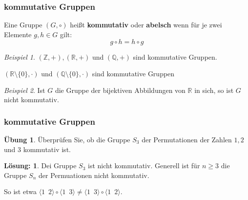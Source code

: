 \documentclass[hyperref={pdfpagelabels=false}]{beamer}
\theoremstyle{plain}%
\theoremstyle{definition}
\newtheorem*{uebung}{Übung}
\newtheorem*{sol}{Lösung:}
\theoremstyle{remark}
\newtheorem*{beispiel}{Beispiel}
\begin{document}
\begin{frame}
\frametitle{kommutative Gruppen}

\begin{definition} Eine Gruppe $(G, \circ)$ heißt \textbf{kommutativ} oder
\textbf{abelsch} wenn für je zwei Elemente $g, h \in G$ gilt:
  	$$ g \circ h = h \circ g $$
\end{definition}

\pause 
\begin{beispiel} $(\mathbb Z, +), (\mathbb R, +)$ und $(\mathbb Q, +)$ sind kommutative Gruppen.

$(\mathbb R \setminus \{0\}, \cdot)$ und $(\mathbb Q  \setminus \{0\}, \cdot)$ sind kommutative Gruppen
\end{beispiel}
\pause 

\begin{beispiel} Ist $G$ die Gruppe der bijektiven Abbildungen von $\mathbb R$ in sich, 
so ist $G$ nicht kommutativ.
\end{beispiel}

\end{frame}

\begin{frame}
\frametitle{kommutative Gruppen}

\begin{uebung} Überprüfen Sie, ob die Gruppe $S_3$ der Permutationen der Zahlen $1, 2$ und $3$ 
kommutativ ist. 
\end{uebung}

\bigbreak

\pause \pause 

\begin{sol} 
Dei Gruppe $S_3$ ist nicht kommutativ. Generell ist 
für $n \geq 3$ die Gruppe $S_n$ der Permuationen  nicht 
kommutativ. 

\pause 
So ist etwa $\langle 1 \,\,\, 2 \rangle \circ \langle 1 \,\,\, 3 \rangle 
\neq \langle 1 \,\,\, 3 \rangle \circ \langle 1 \,\,\, 2 \rangle$.
\end{sol}

\end{frame}
\end{document}
